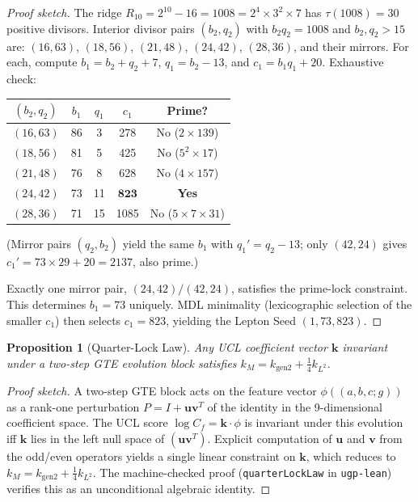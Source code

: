 \documentclass[11pt]{article}
\newtheorem{proposition}[theorem]{Proposition}
\theoremstyle{remark}
\newcommand{\Cf}{C_{\!f}}
\newcommand{\triple}{(a,b,c;g)}
\begin{document}
\begin{appendices}
\begin{proof}[Proof sketch]
The ridge $R_{10} = 2^{10} - 16 = 1008 = 2^4 \times 3^2 \times 7$ has $\tau(1008) = 30$ positive divisors.
Interior divisor pairs $(b_2, q_2)$ with $b_2 q_2 = 1008$ and $b_2, q_2 > 15$ are: $(16,63)$, $(18,56)$, $(21,48)$, $(24,42)$, $(28,36)$, and their mirrors.
For each, compute $b_1 = b_2 + q_2 + 7$, $q_1 = b_2 - 13$, and $c_1 = b_1 q_1 + 20$.
Exhaustive check:
\begin{center}
\small
\begin{tabular}{ccccc}
$(b_2, q_2)$ & $b_1$ & $q_1$ & $c_1$ & Prime? \\
\hline
$(16,63)$ & 86 & 3 & 278 & No ($2 \times 139$) \\
$(18,56)$ & 81 & 5 & 425 & No ($5^2 \times 17$) \\
$(21,48)$ & 76 & 8 & 628 & No ($4 \times 157$) \\
$(24,42)$ & 73 & 11 & $\mathbf{823}$ & \textbf{Yes} \\
$(28,36)$ & 71 & 15 & 1085 & No ($5 \times 7 \times 31$) \\
\end{tabular}
\end{center}
(Mirror pairs $(q_2, b_2)$ yield the same $b_1$ with $q_1' = q_2 - 13$; only $(42, 24)$ gives $c_1' = 73 \times 29 + 20 = 2137$, also prime.)

Exactly one mirror pair, $(24,42)/(42,24)$, satisfies the prime-lock constraint.
This determines $b_1 = 73$ uniquely.
MDL minimality (lexicographic selection of the smaller $c_1$) then selects $c_1 = 823$, yielding the Lepton Seed $(1, 73, 823)$.
\end{proof}

\begin{proposition}[Quarter-Lock Law]
\label{prop:ql_sketch}
Any UCL coefficient vector $\mathbf{k}$ invariant under a two-step GTE evolution block satisfies $k_M = k_{\mathrm{gen2}} + \tfrac{1}{4}k_{L^2}$.
\end{proposition}

\begin{proof}[Proof sketch]
A two-step GTE block acts on the feature vector $\phi(\triple)$ as a rank-one perturbation $P = I + \mathbf{u}\mathbf{v}^T$ of the identity in the 9-dimensional coefficient space.
The UCL score $\log \Cf = \mathbf{k} \cdot \phi$ is invariant under this evolution iff $\mathbf{k}$ lies in the left null space of $(\mathbf{u}\mathbf{v}^T)$.
Explicit computation of $\mathbf{u}$ and $\mathbf{v}$ from the odd/even operators yields a single linear constraint on $\mathbf{k}$, which reduces to $k_M = k_{\mathrm{gen2}} + \tfrac{1}{4}k_{L^2}$.
The machine-checked proof (\texttt{quarterLockLaw} in \texttt{ugp-lean}) verifies this as an unconditional algebraic identity.
\end{proof}


\end{appendices}
\end{document}

